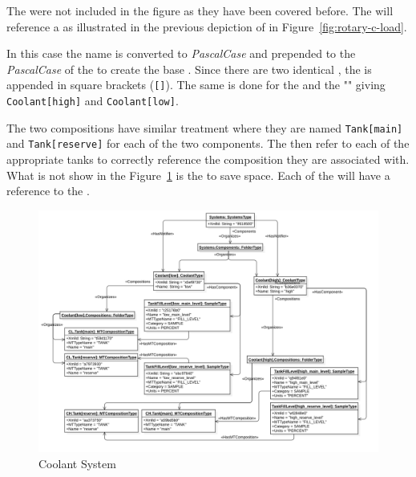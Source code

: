 The  were not included in the figure as they have been covered before. The   will reference a    as illustrated in the previous depiction of  in Figure~\ref{fig:rotary-c-load}.

In this case the  name is converted to \textit{PascalCase} and prepended to the \textit{PascalCase} of the  to create the base . Since there are two identical , the  is appended in square brackets (\texttt{[]}). The same is done for the   and the   "" giving \texttt{Coolant[high]} and \texttt{Coolant[low]}.

The two  compositions have similar treatment where they are named \texttt{Tank[main]} and \texttt{Tank[reserve]} for each of the two components. The  then refer to each of the appropriate tanks to correctly reference the composition they are associated with. What is not show in the Figure~\ref{fig:coolant-system} is the  to save space. Each of the  will have a  reference to the .

\begin{figure}[ht]
  \centering
  \includegraphics[width=1.0\textwidth]{diagrams/mtconnect-mapping/coolant-system.png}
  \caption{Coolant System}
  \label{fig:coolant-system}
\end{figure}

